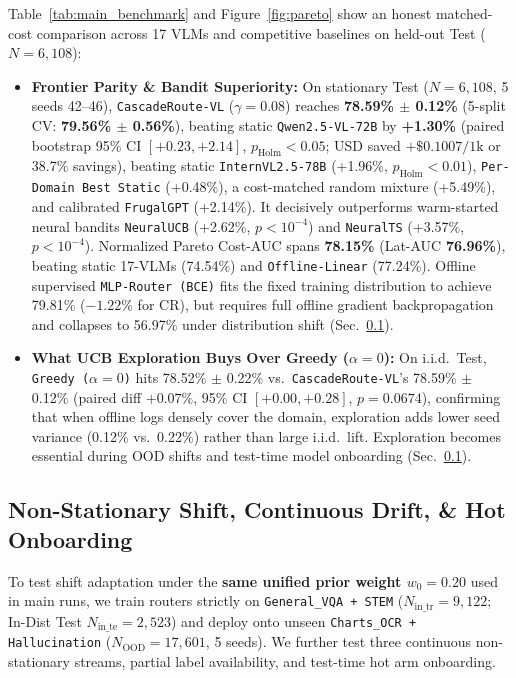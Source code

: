 \documentclass[10pt,twocolumn,letterpaper]{article}
\begin{document}
Table~\ref{tab:main_benchmark} and Figure~\ref{fig:pareto} show an honest matched-cost comparison across 17 VLMs and competitive baselines on held-out Test ($N{=}6{,}108$):
\begin{itemize}
    \item \textbf{Frontier Parity \& Bandit Superiority:} On stationary Test ($N{=}6{,}108$, 5 seeds 42--46), \texttt{CascadeRoute-VL} ($\gamma{=}0.08$) reaches \textbf{78.59\% $\pm$ 0.12\%} (5-split CV: \textbf{79.56\% $\pm$ 0.56\%}), beating static \texttt{Qwen2.5-VL-72B} by \textbf{+1.30\%} (paired bootstrap 95\% CI $[+0.23, +2.14]$, $p_{\text{Holm}} < 0.05$; USD saved $+\$0.1007/1\text{k}$ or 38.7\% savings), beating static \texttt{InternVL2.5-78B} (+1.96\%, $p_{\text{Holm}} < 0.01$), \texttt{Per-Domain Best Static} (+0.48\%), a cost-matched random mixture (+5.49\%), and calibrated \texttt{FrugalGPT} (+2.14\%). It decisively outperforms warm-started neural bandits \texttt{NeuralUCB} (+2.62\%, $p{<}10^{-4}$) and \texttt{NeuralTS} (+3.57\%, $p{<}10^{-4}$). Normalized Pareto Cost-AUC spans \textbf{78.15\%} (Lat-AUC \textbf{76.96\%}), beating static 17-VLMs (74.54\%) and \texttt{Offline-Linear} (77.24\%). Offline supervised \texttt{MLP-Router (BCE)} fits the fixed training distribution to achieve 79.81\% ($-1.22\%$ for CR), but requires full offline gradient backpropagation and collapses to 56.97\% under distribution shift (Sec.~\ref{sec:ood}).
    \item \textbf{What UCB Exploration Buys Over Greedy ($\alpha{=}0$):} On i.i.d.\ Test, \texttt{Greedy ($\alpha{=}0$)} hits 78.52\% $\pm$ 0.22\% vs.\ \texttt{CascadeRoute-VL}'s 78.59\% $\pm$ 0.12\% (paired diff $+0.07\%$, 95\% CI $[+0.00, +0.28]$, $p{=}0.0674$), confirming that when offline logs densely cover the domain, exploration adds lower seed variance (0.12\% vs.\ 0.22\%) rather than large i.i.d.\ lift. Exploration becomes essential during OOD shifts and test-time model onboarding (Sec.~\ref{sec:ood}).
\end{itemize}

\subsection{Non-Stationary Shift, Continuous Drift, \& Hot Onboarding}
\label{sec:ood}

To test shift adaptation under the \textbf{same unified prior weight $w_0{=}0.20$} used in main runs, we train routers strictly on \texttt{General\_VQA + STEM} ($N_{\text{in\_tr}}{=}9{,}122$; In-Dist Test $N_{\text{in\_te}}{=}2{,}523$) and deploy onto unseen \texttt{Charts\_OCR + Hallucination} ($N_{\text{OOD}}{=}17{,}601$, 5 seeds). We further test three continuous non-stationary streams, partial label availability, and test-time hot arm onboarding.
\end{document}
